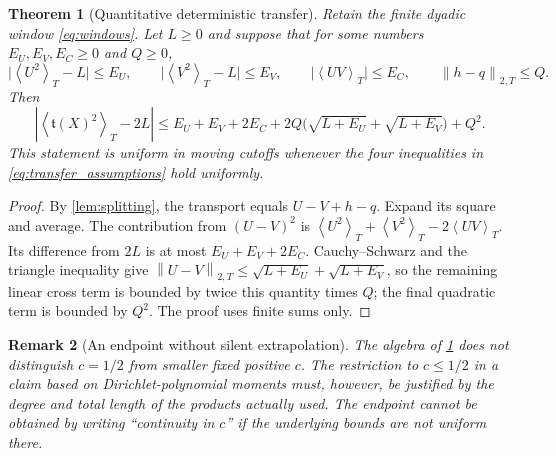 \documentclass[11pt,reqno]{amsart}
\numberwithin{equation}{section}
\newtheorem{theorem}{Theorem}[section]
\newtheorem{remark}[theorem]{Remark}
\newcommand{\av}[1]{\left\langle #1\right\rangle_T}
\newcommand{\norm}[1]{\left\|#1\right\|_{2,T}}
\begin{document}
\begin{theorem}[Quantitative deterministic transfer]\label{thm:transfer}
Retain the finite dyadic window \eqref{eq:windows}. Let $L\ge0$ and suppose that for some numbers $E_U,E_V,E_C\ge0$ and $Q\ge0$,
\begin{equation}\label{eq:transfer_assumptions}
\big|\av{U^2}-L\big|\le E_U,\qquad
\big|\av{V^2}-L\big|\le E_V,\qquad
\big|\av{UV}\big|\le E_C,\qquad
\norm{h-q}\le Q.
\end{equation}
Then
\begin{equation}\label{eq:transfer_bound}
\left|\av{\mathfrak t(X)^2}-2L\right|
\le E_U+E_V+2E_C
+2Q\bigl(\sqrt{L+E_U}+\sqrt{L+E_V}\bigr)+Q^2.
\end{equation}
This statement is uniform in moving cutoffs whenever the four inequalities in \eqref{eq:transfer_assumptions} hold uniformly.
\end{theorem}
\begin{proof}
By \cref{lem:splitting}, the transport equals $U-V+h-q$. Expand its square and average. The contribution from $(U-V)^2$ is $\av{U^2}+\av{V^2}-2\av{UV}$. Its difference from $2L$ is at most $E_U+E_V+2E_C$. Cauchy--Schwarz and the triangle inequality give $\norm{U-V}\le\sqrt{L+E_U}+\sqrt{L+E_V}$, so the remaining linear cross term is bounded by twice this quantity times $Q$; the final quadratic term is bounded by $Q^2$. The proof uses finite sums only.
\end{proof}



\begin{remark}[An endpoint without silent extrapolation]
The algebra of \cref{thm:transfer} does not distinguish $c=1/2$ from smaller fixed positive $c$. The restriction to $c\le1/2$ in a claim based on Dirichlet-polynomial moments must, however, be justified by the degree and total length of the products actually used. The endpoint cannot be obtained by writing ``continuity in $c$'' if the underlying bounds are not uniform there.
\end{remark}
\end{document}
